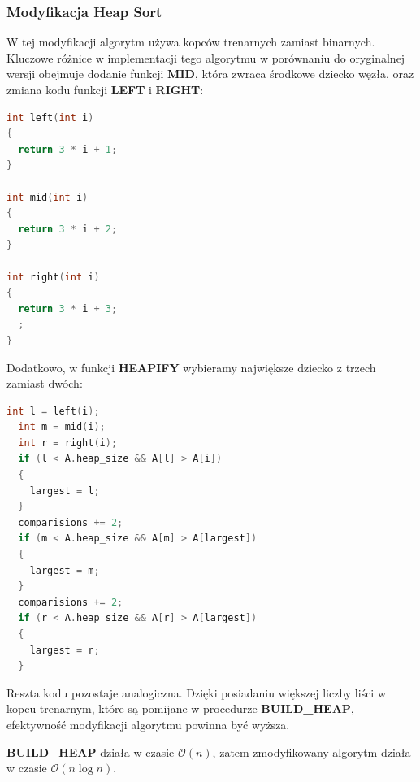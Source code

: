 \documentclass{article}
\newcommand{\bigO}{\mathcal{O}}
\begin{document}
\subsubsection{Modyfikacja Heap Sort}
W tej modyfikacji algorytm używa kopców trenarnych zamiast binarnych. Kluczowe różnice w implementacji tego algorytmu w porównaniu do oryginalnej wersji obejmuje dodanie funkcji \textbf{MID}, która zwraca środkowe dziecko węzła, oraz zmiana kodu funkcji \textbf{LEFT} i \textbf{RIGHT}:
\begin{lstlisting}[style=mystyle, language=C++, caption={Implementacja \texttt{Left}, \texttt{Mid} i \texttt{Right}}, label={lst:lmr}]
int left(int i)
{
  return 3 * i + 1;
}

int mid(int i)
{
  return 3 * i + 2;
}

int right(int i)
{
  return 3 * i + 3;
  ;
}
\end{lstlisting}
Dodatkowo, w funkcji \textbf{HEAPIFY} wybieramy największe dziecko z trzech zamiast dwóch:
\begin{lstlisting}[style=mystyle, language=C++, caption={Część implementacji zmodyfikowanego \texttt{Heapify}}, label={lst:buildheap2}]
  int l = left(i);
  int m = mid(i);
  int r = right(i);
  if (l < A.heap_size && A[l] > A[i])
  {
    largest = l;
  }
  comparisions += 2;
  if (m < A.heap_size && A[m] > A[largest])
  {
    largest = m;
  }
  comparisions += 2;
  if (r < A.heap_size && A[r] > A[largest])
  {
    largest = r;
  }
\end{lstlisting}
Reszta kodu pozostaje analogiczna. Dzięki posiadaniu większej liczby liści w kopcu trenarnym, które są pomijane w procedurze \textbf{BUILD\_HEAP}, efektywność modyfikacji algorytmu powinna być wyższa.

\textbf{BUILD\_HEAP} działa w czasie $\bigO(n)$, zatem zmodyfikowany algorytm działa w czasie $\bigO (n \log n)$.
\end{document}

